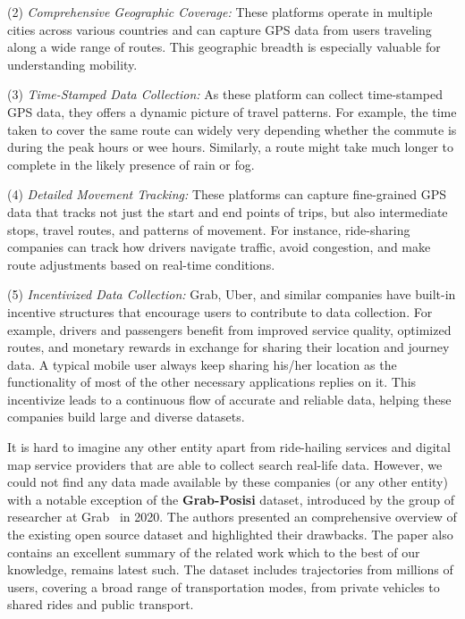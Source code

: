 \documentclass[sigplan,screen]{acmart}
\begin{document}
(2) \emph{Comprehensive Geographic Coverage:}
These platforms operate in multiple cities across various countries and 
can capture GPS data from users traveling along a wide range of routes.
This geographic breadth is especially valuable for understanding 
mobility.

(3) \emph{Time-Stamped Data Collection:}
As these platform can collect time-stamped GPS data,
they offers a dynamic picture of travel patterns.
For example, the time taken to cover the same route
can widely very depending whether the commute is during
the peak hours or wee hours.
Similarly, a route might take much longer to complete
in the likely presence of rain or fog.

(4) \emph{Detailed Movement Tracking:}
These platforms can capture fine-grained GPS data that tracks not just the start and end points of trips, but also intermediate stops, travel routes, and patterns of movement. 
For instance, ride-sharing companies can track how drivers navigate traffic, avoid congestion, and make route adjustments based on real-time conditions. %

(5) \emph{Incentivized Data Collection:}
 Grab, Uber, and similar companies have built-in incentive structures that encourage users to contribute to data collection. 
For example, drivers and passengers benefit from improved service quality, optimized routes, and monetary rewards in exchange for sharing their location and journey data. 
A typical mobile user always keep sharing his/her location
as the functionality of most of the other necessary applications
replies on it.
This incentivize leads to a continuous flow of accurate and reliable data, helping these companies build large and diverse datasets.

It is hard to imagine any other entity apart from 
ride-hailing services and digital map service providers
that are able to collect search real-life data.
However, we could not find any data made available by these companies
(or any other entity) with a notable exception 
of the \textbf{Grab-Posisi} dataset, introduced by the group of researcher
at Grab~\cite{DBLP:conf/gis/XuYDHKFWZ20} in 2020.
The authors presented an comprehensive overview of the 
existing open source dataset and highlighted  their
drawbacks.
The paper also contains an excellent summary of 
the related work which to the best of our knowledge,
remains latest such.
The dataset includes trajectories from millions of users, covering a broad range of transportation modes, from private vehicles to shared rides and public transport.
\end{document}
